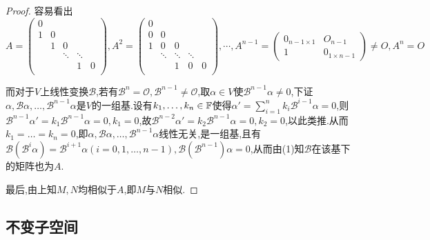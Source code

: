 \documentclass[11pt]{article}
\begin{document}
\begin{proof}
    容易看出
    $$A=\begin{pmatrix}
        0 &  &  &  &  \\
        1 & 0 &  &  &  \\
         & 1 & 0 &  &  \\
         &  & \ddots & \ddots &  \\
         &  &  & 1 & 0 \\
    \end{pmatrix}, A^{2}=\begin{pmatrix}
        0 &  &  &  &  \\
        0 & 0 &  &  &  \\
        1 & 0 & 0 &  &  \\
         & \ddots & \ddots & \ddots &  \\
         &  & 1 & 0 & 0 \\
    \end{pmatrix}, \cdots, A^{n-1}=\begin{pmatrix}
        0_{n-1\times 1}& O_{n-1}\\
        1 & 0_{1\times n-1}
    \end{pmatrix}\neq O, A^n=O$$

    而对于$V$上线性变换$\mathscr{B}$,若有$\mathscr{B}^n=\mathscr{O}, \mathscr{B}^{n-1}\neq\mathscr{O}$,取$\alpha\in V$使$\mathscr{B}^{n-1}\alpha\neq 0$,下证$\alpha,\mathscr{B}\alpha,\dots,\mathscr{B}^{n-1}\alpha$是$V$的一组基.设有$k_1,\dots,k_n\in \mathbb{F}$使得$\alpha'=\sum_{i=1}^{n}k_i\mathscr{B}^{i-1}\alpha=0$,则$\mathscr{B}^{n-1}\alpha'=k_1\mathscr{B}^{n-1}\alpha=0, k_1=0$,故$\mathscr{B}^{n-2}\alpha'=k_2\mathscr{B}^{n-1}\alpha=0, k_2=0$,以此类推.从而$k_1=\dots=k_n=0$,即$\alpha,\mathscr{B}\alpha,\dots,\mathscr{B}^{n-1}\alpha$线性无关,是一组基,且有$\mathscr{B}(\mathscr{B}^i\alpha)=\mathscr{B}^{i+1}\alpha (i=0,1,\dots,n-1), \mathscr{B}(\mathscr{B}^{n-1})\alpha=0$,从而由(1)知$\mathscr{B}$在该基下的矩阵也为$A$.

    最后,由上知$M,N$均相似于$A$,即$M$与$N$相似.
\end{proof}

\subsection{不变子空间}
\end{document}
